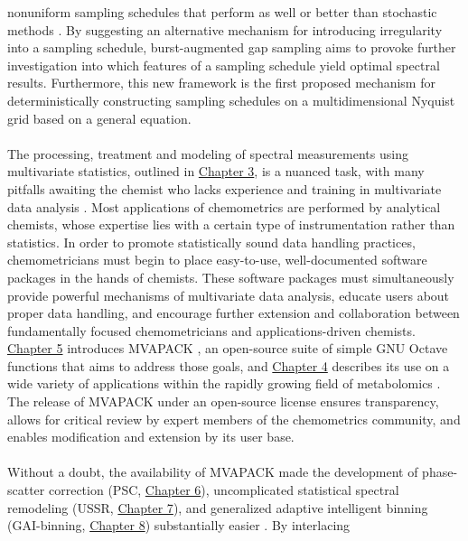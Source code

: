 \begin{doublespace}
nonuniform sampling schedules that perform as well or better than stochastic
methods \cite{worley:jmr2015}. By suggesting an alternative mechanism for
introducing irregularity into a sampling schedule, burst-augmented gap
sampling aims to provoke further investigation into which features of a
sampling schedule yield optimal spectral results. Furthermore, this new
framework is the first proposed mechanism for deterministically constructing
sampling schedules on a multidimensional Nyquist grid \cite{eddy:jmr2012}
based on a general equation.
\\\\
The processing, treatment and modeling of spectral measurements using
multivariate statistics, outlined in \hyperlink{chapter.3}{Chapter 3},
is a nuanced task, with many pitfalls awaiting the chemist who lacks
experience and training in multivariate data analysis
\cite{worley:cmb2013,worley:anchem2015}. Most applications of chemometrics
are performed by analytical chemists, whose expertise lies with a certain
type of instrumentation rather than statistics. In order to promote
statistically sound data handling practices, chemometricians
must begin to place easy-to-use, well-documented software packages in the
hands of chemists. These software packages must simultaneously provide
powerful mechanisms of multivariate data analysis, educate users about
proper data handling, and encourage further extension and collaboration
between fundamentally focused chemometricians and applications-driven
chemists. \hyperlink{chapter.5}{Chapter 5} introduces MVAPACK
\cite{worley:acscb2014}, an open-source suite of simple GNU Octave
\cite{eaton2008} functions that aims to address those goals, and
\hyperlink{chapter.4}{Chapter 4} describes its use on a wide variety of
applications within the rapidly growing field of metabolomics
\cite{worley:acscb2014,marshall:metab2015,worley:anchem2015}. The release
of MVAPACK under an open-source license ensures transparency, allows for
critical review by expert members of the chemometrics community, and
enables modification and extension by its user base.
\\\\
Without a doubt, the availability of MVAPACK made the development of
phase-scatter correction
(PSC, \hyperlink{chapter.6}{Chapter 6}),
uncomplicated statistical spectral remodeling
(USSR, \hyperlink{chapter.7}{Chapter 7}),
and generalized adaptive intelligent binning
(GAI-binning, \hyperlink{chapter.8}{Chapter 8})
substantially easier
\cite{worley:cils2014,worley:jbnmr2015,worley:cils2015}. By interlacing

\end{doublespace}
